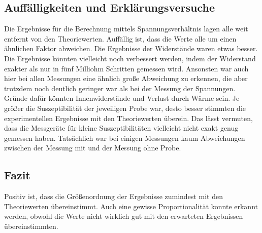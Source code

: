


\subsection{Auffälligkeiten und Erklärungsversuche}
Die Ergebnisse für die Berechnung mittels Spannungsverhältnis lagen alle weit entfernt von den Theoriewerten.  
Auffällig ist, dass die Werte alle um einen ähnlichen Faktor abweichen. 
\newline
Die Ergebnisse der Widerstände waren etwas besser. Die Ergebnisse könnten vielleicht noch verbessert werden, indem der Widerstand exakter als 
nur in fünf Milliohm Schritten gemessen wird. Ansonsten war auch hier bei allen Messungen eine ähnlich große Abweichung zu erkennen, die aber 
trotzdem noch deutlich geringer war als bei der Messung der Spannungen. Gründe dafür könnten Innenwiderstände und Verlust durch Wärme sein. 
\newline
Je größer die Suszeptibilität der jeweiligen Probe war, desto besser stimmten die experimentellen Ergebnisse mit den Theoriewerten überein. 
Das lässt vermuten, dass die Messgeräte für kleine Suszeptibilitäten vielleicht nicht exakt genug gemessen haben. Tatsächlich war bei 
einigen Messungen kaum Abweichungen zwischen der Messung mit und der Messung ohne Probe. 

\subsection{Fazit}
Positiv ist, dass die Größenordnung der Ergebnisse zumindest mit den Theoriewerten übereinstimmt. Auch eine gewisse  Proportionalität konnte 
erkannt werden, obwohl die Werte nicht wirklich gut mit den erwarteten Ergebnissen übereinstimmten.
